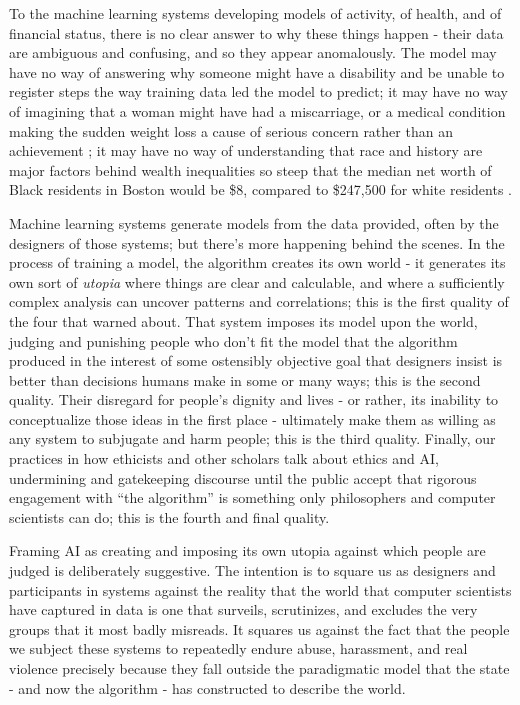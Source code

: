 \documentclass[manuscript,screen]{acmart}
\begin{document}
To the machine learning systems developing models of activity, of health, and of financial status, there is no clear answer to why these things happen - their data are ambiguous and confusing, and so they appear anomalously.
The model may have no way of answering why someone might have a disability and be unable to register steps the way training data led the model to predict;
it may have no way of imagining that a woman might have had a miscarriage, or a medical condition making the sudden weight loss a cause of serious concern rather than an achievement
\cite{wachter2017technically};
it may have no way of understanding that race and history are major factors behind wealth inequalities so steep that the median net worth of Black residents in Boston would be \$8, compared to \$247,500 for white residents
\cite{BostonEIGHT}.

Machine learning systems generate models from the data provided, often by the designers of those systems;
but there's more happening behind the scenes.
In the process of training a model, the algorithm creates its own world  - it generates its own sort of \emph{utopia} where things are clear and calculable, and where a sufficiently complex analysis can uncover patterns and correlations;
this is the first quality of the four that \citeauthor{scott1998seeing} warned about.
That system imposes its model upon the world, judging and punishing people who don't fit the model that the algorithm produced in the interest of some ostensibly objective goal that designers insist is better than decisions humans make in some or many ways;
this is the second quality.
Their disregard for people's dignity and lives - or rather, its inability to conceptualize those ideas in the first place - ultimately make them as willing as any system to subjugate and harm people;
this is the third quality.
Finally, our practices in how ethicists and other scholars talk about ethics and AI, undermining and gatekeeping discourse until the public accept that rigorous engagement with ``the algorithm'' is something only philosophers and computer scientists can do;
this is the fourth and final quality.

Framing AI as creating and imposing its own utopia against which people are judged is deliberately suggestive.
The intention is to square us as designers and participants in systems against the reality that the world that computer scientists have captured in data is one that surveils, scrutinizes, and excludes the very groups that it most badly misreads.
It squares us against the fact that the people we subject these systems to repeatedly endure abuse, harassment, and real violence precisely because they fall outside the paradigmatic model that the state - and now the algorithm - has constructed to describe the world.
\end{document}
